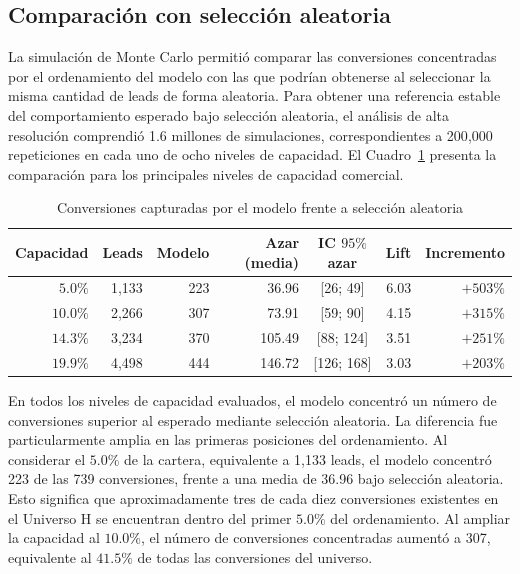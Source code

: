 \subsection{Comparación con selección aleatoria}
\label{subsec:lectura-comercial}

La simulación de Monte Carlo permitió comparar las conversiones concentradas por el ordenamiento del modelo con las que podrían obtenerse al seleccionar la misma cantidad de leads de forma aleatoria. Para obtener una referencia estable del comportamiento esperado bajo selección aleatoria, el análisis de alta resolución comprendió 1.6 millones de simulaciones, correspondientes a 200{,}000 repeticiones en cada uno de ocho niveles de capacidad. El Cuadro~\ref{cuad:montecarlo} presenta la comparación para los principales niveles de capacidad comercial.

\begin{table}[H]
\centering
\caption{Conversiones capturadas por el modelo frente a selección aleatoria}
\label{cuad:montecarlo}
\small
\begin{tabular}{rrrrcrr}
\hline
\textbf{Capacidad} & \textbf{Leads} & \textbf{Modelo} & \textbf{Azar (media)} & \textbf{IC $95\%$ azar} & \textbf{Lift} & \textbf{Incremento} \\
\hline
$5.0\%$  & 1{,}133 & 223 & 36.96  & [26; 49]   & 6.03 & $+503\%$ \\
$10.0\%$ & 2{,}266 & 307 & 73.91  & [59; 90]   & 4.15 & $+315\%$ \\
$14.3\%$ & 3{,}234 & 370 & 105.49 & [88; 124]  & 3.51 & $+251\%$ \\
$19.9\%$ & 4{,}498 & 444 & 146.72 & [126; 168] & 3.03 & $+203\%$ \\
\hline
\end{tabular}
\fuentepropia
\end{table}

En todos los niveles de capacidad evaluados, el modelo concentró un número de conversiones superior al esperado mediante selección aleatoria. La diferencia fue particularmente amplia en las primeras posiciones del ordenamiento. Al considerar el $5.0\%$ de la cartera, equivalente a 1{,}133 leads, el modelo concentró 223 de las 739 conversiones, frente a una media de 36.96 bajo selección aleatoria. Esto significa que aproximadamente tres de cada diez conversiones existentes en el Universo H se encuentran dentro del primer $5.0\%$ del ordenamiento. Al ampliar la capacidad al $10.0\%$, el número de conversiones concentradas aumentó a 307, equivalente al $41.5\%$ de todas las conversiones del universo.


